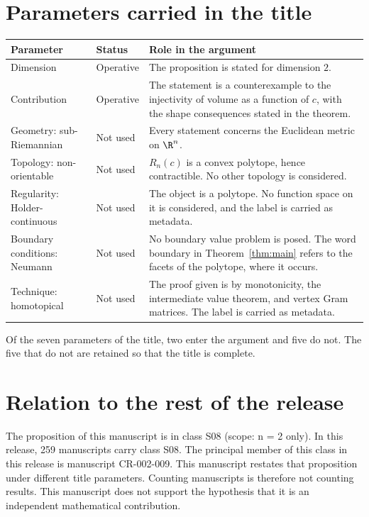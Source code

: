 \documentclass[11pt]{article}
\begin{document}
\section{Parameters carried in the title}\label{sec:params}
\begin{center}
\small
\begin{tabular}{p{}p{}p{}}
\toprule
Parameter & Status & Role in the argument \\
\midrule
Dimension & Operative & The proposition is stated for dimension $2$. \\
Contribution & Operative & The statement is a counterexample to the injectivity of volume as a function of $c$, with the shape consequences stated in the theorem. \\
Geometry: sub-Riemannian & Not used & Every statement concerns the Euclidean metric on $\R^n$. \\
Topology: non-orientable & Not used & $R_n(c)$ is a convex polytope, hence contractible. No other topology is considered. \\
Regularity: Holder-continuous & Not used & The object is a polytope. No function space on it is considered, and the label is carried as metadata. \\
Boundary conditions: Neumann & Not used & No boundary value problem is posed. The word boundary in Theorem~\ref{thm:main} refers to the facets of the polytope, where it occurs. \\
Technique: homotopical & Not used & The proof given is by monotonicity, the intermediate value theorem, and vertex Gram matrices. The label is carried as metadata. \\
\bottomrule
\end{tabular}
\end{center}
Of the seven parameters of the title, two enter the argument and five do not. The five that do not are retained so that the title is complete.

\section{Relation to the rest of the release}
The proposition of this manuscript is in class S08 (scope: n = 2 only).
In this release, 259 manuscripts carry class S08. The principal member of this class in this release is manuscript CR-002-009. This manuscript restates that proposition under different title parameters.
Counting manuscripts is therefore not counting results. This manuscript does not support the hypothesis that it is an independent mathematical contribution.
\end{document}
